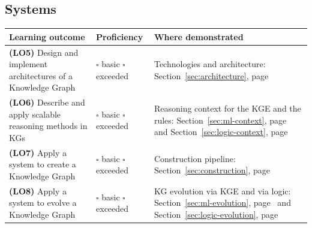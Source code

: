 \documentclass{article}
\newcommand{\lopage}[1]{Section~\ref{#1}, page~\pageref{#1}}
\begin{document}
\subsection*{Systems}
\begin{table}[h]
\centering
\begin{tabular}{p{5.2cm}p{2.6cm}p{5.4cm}}
\toprule
\textbf{Learning outcome} & \textbf{Proficiency} & \textbf{Where demonstrated} \\
\midrule
\textbf{(LO5)} Design and implement architectures of a Knowledge Graph &
$\square$ basic \newline $\square$ exceeded &
Technologies and architecture: \lopage{sec:architecture} \\
\addlinespace
\textbf{(LO6)} Describe and apply scalable reasoning methods in KGs &
$\square$ basic \newline $\square$ exceeded &
Reasoning context for the KGE and the rules: \lopage{sec:ml-context} and \lopage{sec:logic-context} \\
\addlinespace
\textbf{(LO7)} Apply a system to create a Knowledge Graph &
$\square$ basic \newline $\square$ exceeded &
Construction pipeline: \lopage{sec:construction} \\
\addlinespace
\textbf{(LO8)} Apply a system to evolve a Knowledge Graph &
$\square$ basic \newline $\square$ exceeded &
KG evolution via KGE and via logic: \lopage{sec:ml-evolution} and \lopage{sec:logic-evolution} \\
\bottomrule
\end{tabular}
\end{table}
\end{document}
